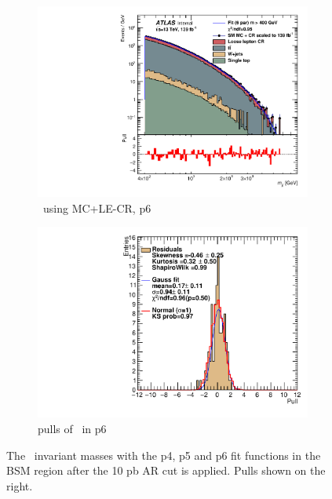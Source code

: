\begin{figure}[H]
\begin{subfigure}[h]{0.38\linewidth}
    \includegraphics[scale=0.3]{figs/ch6/fit/variable_nosmooth/p6/10PB/output_SMMCplusCR_Mjj_p6.pdf}%
    \caption{\mjj \ using MC+LE-CR, p6}
    \end{subfigure}
    \hfill
    \begin{subfigure}[h]{0.4\linewidth}
    \includegraphics[scale=0.32]{figs/ch6/fit/variable_nosmooth/p6/10PB/pull_SMMCplusCR_Mjj_p6.pdf}%
    \caption{pulls of \mjj \ in p6}
    \end{subfigure}
    \hfill
    \caption{The \mjj \ invariant masses with the p4, p5 and p6 fit functions in the BSM region after the 10 pb AR cut is applied. Pulls shown on the right.}
\label{fig:mjj-fit-pulls}
\end{figure}

\newpage

